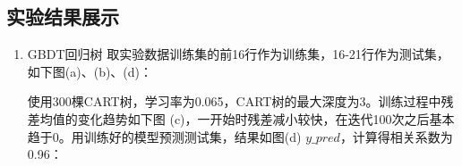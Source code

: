 \documentclass[UTF8,a4paper,12pt]{article}
\begin{document}
\subsection{实验结果展示}
\begin{enumerate}[itemindent=0.5em,label=\arabic*、]
  \item GBDT回归树
  取实验数据训练集的前16行作为训练集，16-21行作为测试集，如下图(a)、(b)、(d)：
  \begin{figure}[H]
  \centering
  \end{figure}
  使用300棵CART树，学习率为0.065，CART树的最大深度为3。训练过程中残差均值的变化趋势如下图
  (c)，一开始时残差减小较快，在迭代100次之后基本趋于0。用训练好的模型预测测试集，结果如图(d)
  $y\_pred$，计算得相关系数为0.96：
  \begin{figure}[H]
  \centering

\end{figure}
\end{enumerate}
\end{document}
